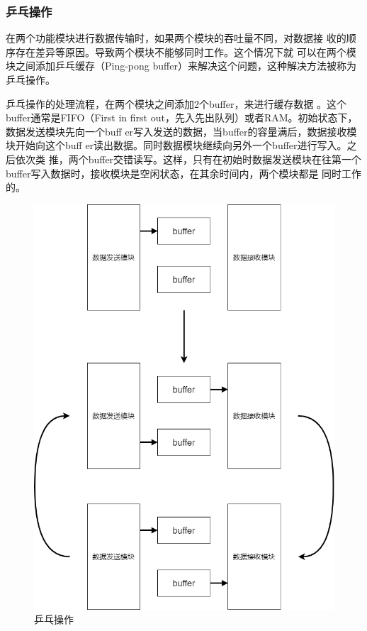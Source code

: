 \documentclass{article}
\numberwithin {equation}{section}
\begin{document}
\begin{spacing}{1.25}
        \subsubsection{乒乓操作}
          \vspace{1em}
          在两个功能模块进行数据传输时，如果两个模块的吞吐量不同，对数据接
          收的顺序存在差异等原因。导致两个模块不能够同时工作。这个情况下就
          可以在两个模块之间添加乒乓缓存（Ping-pong 
          buffer）来解决这个问题，这种解决方法被称为乒乓操作。

          乒乓操作的处理流程，在两个模块之间添加2个buffer，来进行缓存数据
          。这个buffer通常是FIFO（First in first 
          out，先入先出队列）或者RAM。初始状态下，数据发送模块先向一个buff
          er写入发送的数据，当buffer的容量满后，数据接收模块开始向这个buff
          er读出数据。同时数据模块继续向另外一个buffer进行写入。之后依次类
          推，两个buffer交错读写。这样，只有在初始时数据发送模块在往第一个
          buffer写入数据时，接收模块是空闲状态，在其余时间内，两个模块都是
          同时工作的。
          \begin{figure}[H]
            \centering
            \includegraphics[scale=0.3]{./pictures/乒乓操作.png}
            \caption{乒乓操作}
            \label{2D array}
          \end{figure}

\end{spacing}
\end{document}
